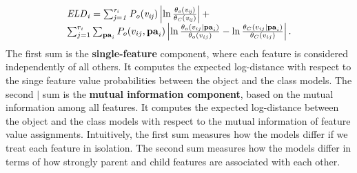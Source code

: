 \documentclass[conference]{IEEEtran}
\begin{document}
\begin{equation} \label{eq:log-dist}
\begin{array}{l}
		\mid_{i} =\sum_{j=1}^{\states_{i}} P_{\object}(\nodevalue_{ij}) \left|\ln \frac{\parameter_{\object}( \nodevalue_{ij})}{\parameter_{\Class}( \nodevalue_{ij})}\right|+\\
		\sum_{j=1}^{\states_{i}} \sum_{\parents_{i}} 
		P_{\object}( \nodevalue_{ij},\parents_{i})
		\left|\ln \frac{\parameter_{\object}( \nodevalue_{ij}|\parents_{i})}{\parameter_{\object}(\nodevalue_{ij})} - \ln \frac{\parameter_{\Class}( \nodevalue_{ij}|\parents_{i})}{\parameter_{\Class}(\nodevalue_{ij})}\right|. \end{array}
		\end{equation}
%
The first sum is the \textbf{single-feature} component, where each feature is considered independently of all others. It computes the expected log-distance with respect to  the singe feature value probabilities between the object and the class models. 
%
The second $\mid$ sum is the \textbf{mutual information component}, based on the mutual information among all features. It computes the expected log-distance between the object and the class models with respect to the mutual information of feature value assignments.
Intuitively, the first sum measures how the models differ if we treat each feature in isolation. The second sum measures how the models differ in terms of how strongly parent and child features are associated with each other. 
\end{document}
